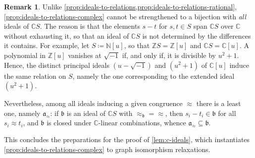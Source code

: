 \documentclass[11pt]{scrartcl}
\theoremstyle{definition}
\newtheorem{remark}[definition]{Remark}
\theoremstyle{plain}
\theoremstyle{remark}
\begin{document}
	\begin{remark}\label{rem:no-bijection-complex}
		Unlike \cref{prop:ideals-to-relations,prop:ideals-to-relations-rational},
		\cref{prop:ideals-to-relations-complex} cannot be strengthened to a bijection with \emph{all} ideals of $\mathbb{C}S$.
		The reason is that the elements $s - t$ for $s, t \in S$ span $\mathbb{C}S$ over $\mathbb{C}$ without exhausting it,
		so that an ideal of $\mathbb{C}S$ is not determined by the differences it contains.
		For example, let $S \coloneqq \mathbb{N}[u]$, so that $\mathbb{Z}S = \mathbb{Z}[u]$ and $\mathbb{C}S = \mathbb{C}[u]$.
		A polynomial in $\mathbb{Z}[u]$ vanishes at $\sqrt{-1}$ if, and only if, it is divisible by $u^2 + 1$.
		Hence, the distinct principal ideals $(u - \sqrt{-1})$ and $(u^2+1)$ of $\mathbb{C}[u]$
		induce the same relation on $S$,
		namely the one corresponding to the extended ideal $(u^2+1)$.

		Nevertheless, among all ideals inducing a given congruence $\approx$
		there is a least one, namely $\mathfrak{a}_{\approx}$:
		if $\mathfrak{b}$ is an ideal of $\mathbb{C}S$ with ${\approx_{\mathfrak{b}}} = {\approx}$,
		then $s_i - t_i \in \mathfrak{b}$ for all $s_i \approx t_i$,
		and $\mathfrak{b}$ is closed under $\mathbb{C}$-linear combinations,
		whence $\mathfrak{a}_{\approx} \subseteq \mathfrak{b}$.
	\end{remark}

	This concludes the preparations for the proof of \cref{lem:c-ideals},
	which instantiates \cref{prop:ideals-to-relations-complex} to graph isomorphism relaxations.
\end{document}
